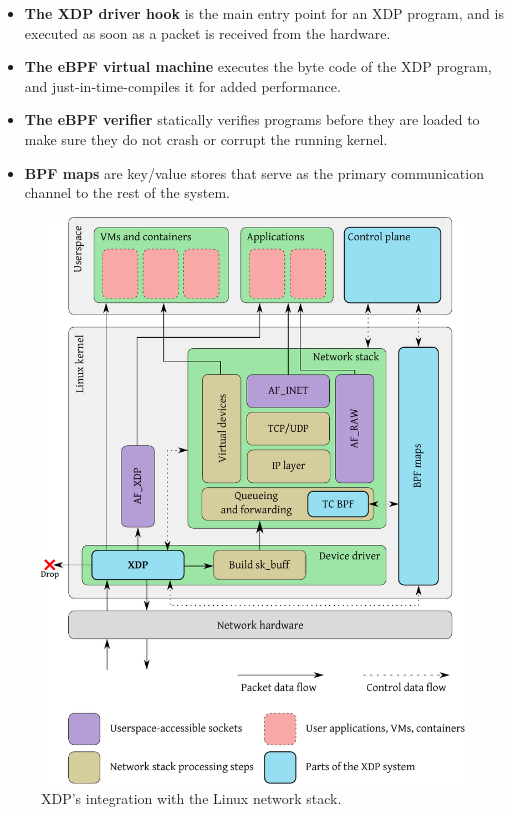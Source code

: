 \documentclass[10pt,sigconf,anonymous]{acmart}
\begin{document}
\begin{itemize}
\item \textbf{The XDP driver hook} is the main entry point for an XDP program,
  and is executed as soon as a packet is received from the hardware.

\item \textbf{The eBPF virtual machine} executes the byte code of the XDP
  program, and just-in-time-compiles it for added performance.

\item \textbf{The eBPF verifier} statically verifies programs before they are
  loaded to make sure they do not crash or corrupt the running kernel.

\item \textbf{BPF maps} are key/value stores that serve as the primary
  communication channel to the rest of the system.
\end{itemize}

\begin{figure}[t]
\centering
\includegraphics[width=\linewidth]{figures/kernel-diagram.pdf}
\caption{\label{fig:xdp-kernel} XDP's integration with the Linux network stack.}
\end{figure}
\end{document}
